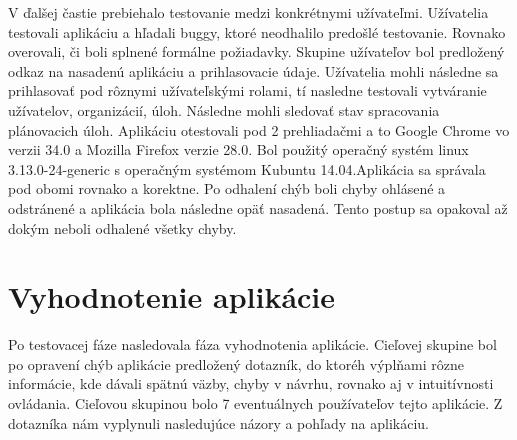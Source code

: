 V ďalšej častie prebiehalo testovanie medzi konkrétnymi užívateľmi. Užívatelia testovali aplikáciu a hľadali buggy, ktoré neodhalilo predošlé testovanie. Rovnako overovali, či boli splnené formálne požiadavky. Skupine užívateľov bol predložený odkaz na nasadenú aplikáciu a prihlasovacie údaje. Užívatelia mohli následne sa prihlasovať pod rôznymi užívateľskými rolami, tí nasledne testovali vytváranie užívatelov, organizácií, úloh. Následne mohli sledovať stav spracovania plánovacich úloh. Aplikáciu otestovali pod 2 prehliadačmi a to Google Chrome vo verzii 34.0 a Mozilla Firefox verzie 28.0. Bol použitý operačný systém linux 3.13.0-24-generic s operačným systémom Kubuntu 14.04.Aplikácia sa správala pod obomi rovnako a korektne. Po odhalení chýb boli chyby ohlásené a odstránené a aplikácia bola následne opäť nasadená. Tento postup sa opakoval až dokým neboli odhalené všetky chyby. 




\section{Vyhodnotenie aplikácie}
Po testovacej fáze nasledovala fáza vyhodnotenia aplikácie. Cieľovej skupine bol po opravení chýb aplikácie predložený dotazník, do ktoréh výplňami rôzne informácie, kde dávali spätnú väzby, chyby v návrhu, rovnako aj v intuitívnosti ovládania. Cieľovou skupinou bolo 7 eventuálnych používateľov tejto aplikácie. Z dotazníka nám vyplynuli nasledujúce názory a pohľady na aplikáciu.


















